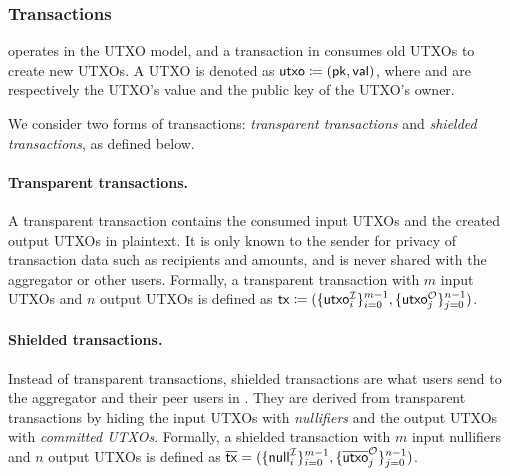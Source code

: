 \subsubsection{Transactions}

\Protocol operates in the \ac{UTXO} model, and a transaction in \Protocol consumes old \acp{UTXO} to create new \acp{UTXO}.
A \ac{UTXO} is denoted as $\mathsf{utxo} \coloneqq ({\mathsf{pk}}, \mathsf{val})$, where \Amount and \Pk are respectively the \ac{UTXO}'s value and the public key of the \ac{UTXO}'s owner.

We consider two forms of transactions: \textit{transparent transactions} and \textit{shielded transactions}, as defined below.

\paragraph{Transparent transactions.}
A transparent transaction contains the consumed input \acp{UTXO} and the created output \acp{UTXO} in plaintext.
It is only known to the sender for privacy of transaction data such as recipients and amounts, and is never shared with the aggregator or other users.
Formally, a transparent transaction with $m$ input \acp{UTXO} and $n$ output \acp{UTXO} is defined as $\mathsf{tx} \coloneqq (\{ \mathsf{utxo}^\mathcal{I}_i \}^{m - 1}_{i = 0}, \{ \mathsf{utxo}^\mathcal{O}_j \}^{n - 1}_{j = 0})$.

\paragraph{Shielded transactions.}
Instead of transparent transactions, shielded transactions are what users send to the aggregator and their peer users in \Protocol.
They are derived from transparent transactions by hiding the input \acp{UTXO} with \textit{nullifiers} and the output \acp{UTXO} with \textit{committed \acp{UTXO}}.
Formally, a shielded transaction with $m$ input nullifiers and $n$ output \acp{UTXO} is defined as $\overline{\mathsf{tx}} = (\{ \mathsf{null}^\mathcal{I}_i \}^{m - 1}_{i = 0}, \{ \overline{\mathsf{utxo}}^\mathcal{O}_j \}^{n - 1}_{j = 0})$.

